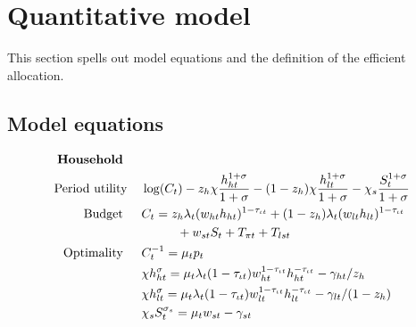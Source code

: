 
\section{Quantitative model}\label{app:quant_mod}
This section spells out model equations and the definition of the efficient allocation. 
\subsection{Model equations}
\vspace{-2mm}
\allowdisplaybreaks
\begin{align}
\text{\textbf{Household}}\ \hspace{4mm}&\nonumber\\ \text{Period utility}\hspace{4mm} &  \log(C_t)-z_h\chi\frac{h_{ht}^{1+\sigma}}{1+\sigma}-(1-z_h)\chi\frac{h_{lt}^{1+\sigma}}{1+\sigma}-\chi_s\frac{S_t^{1+\sigma}}{{1+\sigma}} \nonumber %
\\
\text{Budget}\ \hspace{4mm}& C_t=z_h \lambda_t (w_{ht}h_{ht})^{1-\tau_{\iota t}}+(1-z_h) \lambda_t (w_{lt}h_{lt})^{1-\tau_{\iota t}}\nonumber \\ &\hspace{10mm}+w_{st}S_t+T_{\pi t}+T_{lst}\nonumber\\ %
\text{Optimality}\ \hspace{4mm}
& C_t^{-1}= \mu_tp_{t}\nonumber\\
& \chi h_{ht}^{\sigma}=\mu_t \lambda_t(1-\tau_{\iota t})w_{ht}^{1-\tau_{\iota t}}h_{ht}^{-\tau_{\iota t}}-\gamma_{ht}/z_h\nonumber\\
& \chi h_{lt}^{\sigma}=\mu_t \lambda_t(1-\tau_{\iota t})w_{lt}^{1-\tau_{\iota t}}h_{lt}^{-\tau_{\iota t}}-\gamma_{lt}/(1-z_h)\nonumber\\
& \chi_s S_{t}^{\sigma_s} =\mu_t w_{st}-\gamma_{st} \nonumber\\ %

\end{align}
